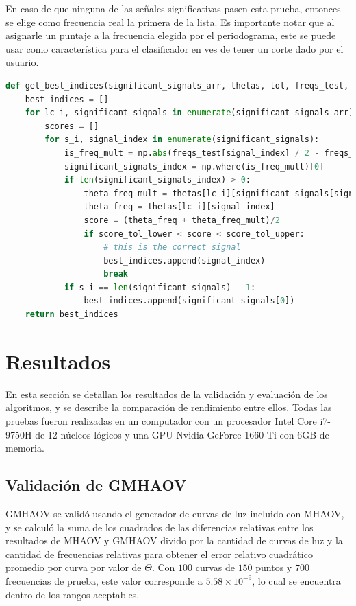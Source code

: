 En caso de que ninguna de las señales significativas pasen esta prueba, entonces se elige como frecuencia real la primera de la lista. Es importante notar que al asignarle un puntaje a la frecuencia elegida por el periodograma, este se puede usar como característica para el clasificador en ves de tener un corte dado por el usuario.
\begin{lstlisting}[language=Python]
    def get_best_indices(significant_signals_arr, thetas, tol, freqs_test, score_tol_lower=0, score_tol_upper=np.inf):
    best_indices = []
    for lc_i, significant_signals in enumerate(significant_signals_arr):
        scores = []
        for s_i, signal_index in enumerate(significant_signals):
            is_freq_mult = np.abs(freqs_test[signal_index] / 2 - freqs_test[significant_signals]) < tol
            significant_signals_index = np.where(is_freq_mult)[0]
            if len(significant_signals_index) > 0:
                theta_freq_mult = thetas[lc_i][significant_signals[significant_signals_index[0]]]
                theta_freq = thetas[lc_i][signal_index]
                score = (theta_freq + theta_freq_mult)/2
                if score_tol_lower < score < score_tol_upper:
                    # this is the correct signal
                    best_indices.append(signal_index)
                    break
            if s_i == len(significant_signals) - 1:
                best_indices.append(significant_signals[0])
    return best_indices
\end{lstlisting}


\chapter{Resultados}\label{chap:resultados}
En esta sección se detallan los resultados de la validación y evaluación de los algoritmos, y se describe la comparación de rendimiento entre ellos. Todas las pruebas fueron realizadas en un computador con un procesador Intel Core i7-9750H de 12 núcleos lógicos y una GPU Nvidia GeForce 1660 Ti con 6GB de memoria.
\section{Validación de GMHAOV}\label{sec:validacion}
GMHAOV se validó usando el generador de curvas de luz incluido con MHAOV, y se calculó la suma de los cuadrados de las diferencias relativas entre los resultados de MHAOV y GMHAOV divido por la cantidad de curvas de luz y la cantidad de frecuencias relativas para obtener el error relativo cuadrático promedio por curva por valor de $\Theta$. Con $100$ curvas de $150$ puntos y $700$ frecuencias de prueba, este valor corresponde a $5.58 \times 10^{-9}$, lo cual se encuentra dentro de los rangos aceptables.

